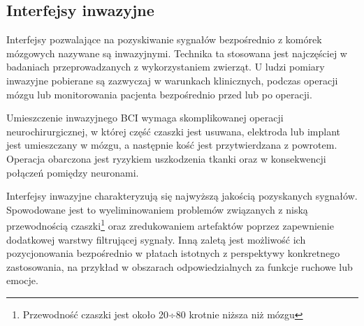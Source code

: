 \documentclass[skorowidz,skroty]{dyplomWEZUT}
\begin{document}
\subsection{Interfejsy inwazyjne\label{subsec:inwazyjne}}
Interfejsy pozwalające na pozyskiwanie sygnałów bezpośrednio z komórek mózgowych nazywane są inwazyjnymi. Technika ta stosowana jest najczęściej w badaniach przeprowadzanych z wykorzystaniem zwierząt\cite{bci_introduction}. U ludzi pomiary inwazyjne pobierane są zazwyczaj w warunkach klinicznych, podczas operacji mózgu lub monitorowania pacjenta bezpośrednio przed lub po operacji.

Umieszczenie inwazyjnego BCI wymaga skomplikowanej operacji neurochirurgicznej, w której część czaszki jest usuwana, elektroda lub implant jest umieszczany w mózgu, a następnie kość jest przytwierdzana z powrotem\cite{bci_introduction}. Operacja obarczona jest ryzykiem uszkodzenia tkanki oraz w konsekwencji połączeń pomiędzy neuronami\cite{bci_revolutionizing}.

Interfejsy inwazyjne charakteryzują się najwyższą jakością pozyskanych sygnałów. Spowodowane jest to wyeliminowaniem problemów związanych z niską przewodnością czaszki\footnote{Przewodność czaszki jest około 20÷80 krotnie niższa niż mózgu\cite{bci_technology}} oraz zredukowaniem artefaktów poprzez zapewnienie dodatkowej warstwy filtrującej sygnały. Inną zaletą jest możliwość ich pozycjonowania bezpośrednio w płatach istotnych z perspektywy konkretnego zastosowania, na przykład w obszarach odpowiedzialnych za funkcje ruchowe lub emocje.
\end{document}
